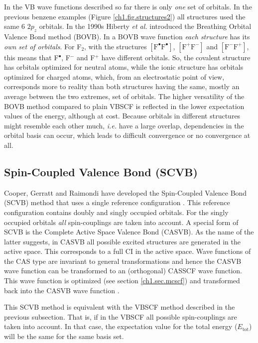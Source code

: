 In the VB wave functions described so far there is only \textit{one} set of orbitals. In the previous benzene examples (Figure \ref{ch1.fig.structures2}) all structures used the same 6 $2p_z$ orbitals. In the 1990s Hiberty \textit{et al.} introduced the Breathing Orbital Valence Bond method (BOVB). In a BOVB wave function \textit{each structure} has its \textit{own set of orbitals}. For F$_2$, with the structures $\mathrm{[F^\bullet F^\bullet]}$, $\mathrm{[F^{+} F^{-}]}$ and $\mathrm{[F^{-} F^{+}]}$, this means that F$^\bullet$, F$^{-}$ and F$^{+}$ have different orbitals. So, the covalent structure has orbitals optimized for neutral atoms, while the ionic structure has orbitals optimized for charged atoms, which, from an electrostatic point of view, corresponds more to reality than both structures having the same, mostly an average between the two extremes, set of orbitals. The higher versatility of the BOVB method compared to plain VBSCF is reflected in the lower expectation values of the energy, although at cost. Because orbitals in different structures might resemble each other much, \textit{i.e.} have a large overlap, dependencies in the orbital basis can occur, which leads to difficult convergence or no convergence at all.

\subsection{\label{ch1.sec.scvb}Spin-Coupled Valence Bond (SCVB)}
Cooper, Gerratt and Raimondi have developed the Spin-Coupled Valence Bond (SCVB) method that uses a single reference configuration \cite{scvb1,scvb2,scvb3}. This reference configuration contains doubly and singly occupied orbitals. For the singly occupied orbitals \textit{all} spin-couplings are taken into account. A special form of SCVB is the Complete Active Space Valence Bond (CASVB). As the name of the latter suggests, in CASVB all possible excited structures are generated in the active space. This corresponds to a full CI in the active space. Wave functions of the CAS type are invariant to general transformations and hence the CASVB wave function can be transformed to an (orthogonal) CASSCF wave function. This wave function is optimized (see section \ref{ch1.sec.mcscf}) and transformed back into the CASVB wave function \cite{thor1,thor2,thor3,thor4}.

This SCVB method is equivalent with the VBSCF method described in the previous subsection. That is, if in the VBSCF all possible spin-couplings are taken into account. In that case, the expectation value for the total energy ($E_\mathrm{tot}$) will be the same for the same basis set.

